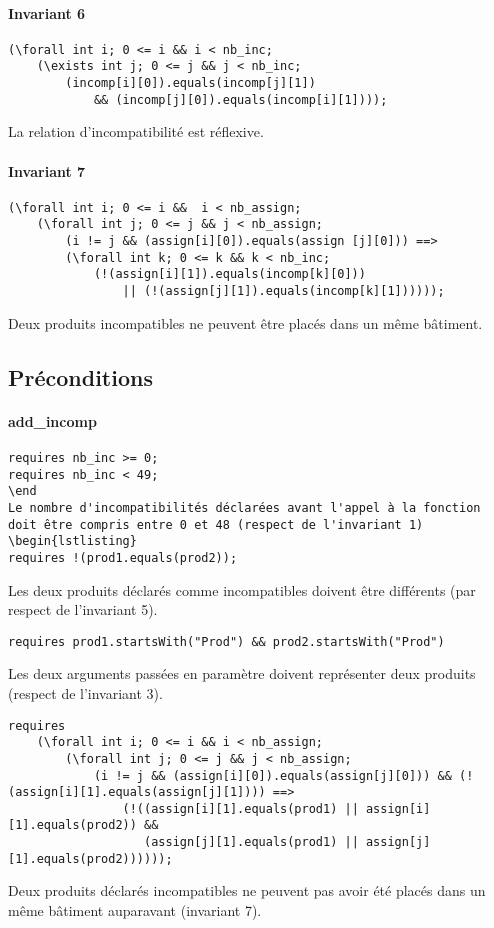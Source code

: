 \documentclass{report}[12pt]
\begin{document}
\paragraph{Invariant 6}
\begin{lstlisting}
(\forall int i; 0 <= i && i < nb_inc; 
	(\exists int j; 0 <= j && j < nb_inc; 
		(incomp[i][0]).equals(incomp[j][1]) 
			&& (incomp[j][0]).equals(incomp[i][1]))); 
\end{lstlisting}
La relation d'incompatibilité est réflexive.

\paragraph{Invariant 7}
\begin{lstlisting}
(\forall int i; 0 <= i &&  i < nb_assign; 
	(\forall int j; 0 <= j && j < nb_assign; 
		(i != j && (assign[i][0]).equals(assign [j][0])) ==>
		(\forall int k; 0 <= k && k < nb_inc;
			(!(assign[i][1]).equals(incomp[k][0])) 
				|| (!(assign[j][1]).equals(incomp[k][1])))));
\end{lstlisting}
Deux produits incompatibles ne peuvent être placés dans un même bâtiment.

\subsection{Préconditions}
\paragraph{add\_incomp}
\begin{lstlisting}
requires nb_inc >= 0; 
requires nb_inc < 49;
\end
Le nombre d'incompatibilités déclarées avant l'appel à la fonction doit être compris entre 0 et 48 (respect de l'invariant 1)
\begin{lstlisting}
requires !(prod1.equals(prod2));
\end{lstlisting}
Les deux produits déclarés comme incompatibles doivent être différents (par respect de l'invariant 5).
\begin{lstlisting}
requires prod1.startsWith("Prod") && prod2.startsWith("Prod")
\end{lstlisting}
Les deux arguments passées en paramètre doivent représenter deux produits (respect de l'invariant 3).
\begin{lstlisting}
requires 
	(\forall int i; 0 <= i && i < nb_assign;
		(\forall int j; 0 <= j && j < nb_assign;
      		(i != j && (assign[i][0]).equals(assign[j][0])) && (!(assign[i][1].equals(assign[j][1]))) ==>
      			(!((assign[i][1].equals(prod1) || assign[i][1].equals(prod2)) &&
      			   (assign[j][1].equals(prod1) || assign[j][1].equals(prod2))))));
\end{lstlisting}
Deux produits déclarés incompatibles ne peuvent pas avoir été placés dans un même bâtiment auparavant (invariant 7).
\end{document}
